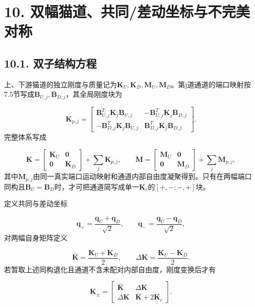 \documentclass[UTF8,a4paper,11pt,fontset=none]{ctexart}
\begin{document}
\section*{10. 双幅猫道、共同/差动坐标与不完美对称}
\subsection*{10.1. 双子结构方程}
上、下游猫道的独立刚度与质量记为\(\mathbf K_U,\allowbreak \mathbf K_D,\allowbreak \mathbf M_U,\allowbreak \mathbf M_D\)\allowbreak{}。第j道通道的端口映射按7.5节写成\(\mathbf B_{U,\allowbreak j},\allowbreak \mathbf B_{D,\allowbreak j}\)\allowbreak{}，其全局刚度块为\par
\[
\mathbf K_{p,j}=
\begin{bmatrix}
\mathbf B_{U,j}^{T}\mathbf K_j\mathbf B_{U,j}&
-\mathbf B_{U,j}^{T}\mathbf K_j\mathbf B_{D,j}\\
-\mathbf B_{D,j}^{T}\mathbf K_j\mathbf B_{U,j}&
\mathbf B_{D,j}^{T}\mathbf K_j\mathbf B_{D,j}
\end{bmatrix}.
\]
完整体系写成\par
\[
\mathbf K=
\begin{bmatrix}
\mathbf K_U&\mathbf0\\
\mathbf0&\mathbf K_D
\end{bmatrix}
+\sum_j\mathbf K_{p,j},
\qquad
\mathbf M=
\begin{bmatrix}
\mathbf M_U&\mathbf0\\
\mathbf0&\mathbf M_D
\end{bmatrix}
+\sum_j\mathbf M_{p,j},
\]
其中\(\mathbf M_{p,\allowbreak j}\)\allowbreak{}由同一真实端口运动映射和通道内部自由度凝聚得到。只有在两幅端口同构且\(\mathbf B_U=\mathbf B_D\)\allowbreak{}时，才可把通道简写成单一\(\mathbf K_c\)\allowbreak{}的\([+,\allowbreak -;\allowbreak -,\allowbreak +]\)\allowbreak{}块。\par
定义共同与差动坐标\par
\[
\mathbf q_+=\frac{\mathbf q_U+\mathbf q_D}{\sqrt2},
\qquad
\mathbf q_-=\frac{\mathbf q_U-\mathbf q_D}{\sqrt2},
\]
对两幅自身矩阵定义\par
\[
\bar{\mathbf K}=\frac{\mathbf K_U+\mathbf K_D}{2},
\qquad
\Delta\mathbf K=\frac{\mathbf K_U-\mathbf K_D}{2}.
\]
若暂取上述同构退化且通道不含未配对内部自由度，刚度变换后才有\par
\[
\mathbf K_{\pm}=
\begin{bmatrix}
\bar{\mathbf K}&\Delta\mathbf K\\
\Delta\mathbf K&\bar{\mathbf K}+2\mathbf K_c
\end{bmatrix}.
\]
\end{document}
